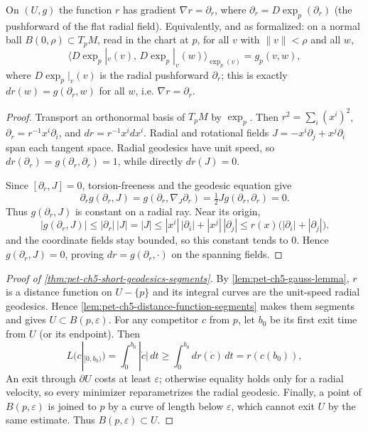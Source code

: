 \begin{lemma}
  \label{lem:pet-ch5-gauss-lemma}
  \leanok
  On $(U,g)$ the function $r$ has gradient $\nabla r=\partial_r$, where
  $\partial_r=D\exp_p(\partial_r)$ (the pushforward of the flat radial field).
  Equivalently, and as formalized: on a normal ball $B(0,\rho)\subset T_pM$,
  read in the chart at $p$, for all $v$ with $\|v\|<\rho$ and all $w$,
  \[
    \big\langle D\exp_p|_v(v),\,D\exp_p|_v(w)\big\rangle_{\exp_p(v)}=g_p(v,w),
  \]
  where $D\exp_p|_v(v)$ is the radial pushforward $\partial_r$; this is exactly
  $dr(w)=g(\partial_r,w)$ for all $w$, i.e. $\nabla r=\partial_r$.
\end{lemma}
\begin{proof}
  \sketch
  Transport an orthonormal basis of $T_pM$ by $\exp_p$.  Then
  $r^2=\sum_i(x^i)^2$, $\partial_r=r^{-1}x^i\partial_i$, and
  $dr=r^{-1}x^idx^i$.  Radial and rotational fields
  $J=-x^i\partial_j+x^j\partial_i$ span each tangent space.  Radial geodesics have
  unit speed, so $dr(\partial_r)=g(\partial_r,\partial_r)=1$, while directly
  $dr(J)=0$.

  Since $[\partial_r,J]=0$, torsion-freeness and the geodesic equation give
  \[
    \partial_rg(\partial_r,J)
    =g(\partial_r,\nabla_J\partial_r)
    =\tfrac12Jg(\partial_r,\partial_r)=0.
  \]
  Thus $g(\partial_r,J)$ is constant on a radial ray.  Near its origin,
  \[
    |g(\partial_r,J)|\le|\partial_r|\,|J|=|J|\le|x^i|\,|\partial_i|+|x^j|\,|\partial_j|
    \le r(x)\big(|\partial_i|+|\partial_j|\big).
  \]
  and the coordinate fields stay bounded, so this constant tends to $0$.  Hence
  $g(\partial_r,J)=0$, proving $dr=g(\partial_r,\cdot)$ on the spanning fields.
\end{proof}
\begin{proof}[Proof of \cref{thm:pet-ch5-short-geodesics-segments}]
  \sketch
  By \cref{lem:pet-ch5-gauss-lemma}, $r$ is a distance function on $U-\{p\}$ and
  its integral curves are the unit-speed radial geodesics.  Hence
  \cref{lem:pet-ch5-distance-function-segments} makes them segments and gives
  $U\subset B(p,\varepsilon)$.  For any competitor $c$ from $p$, let $b_0$ be its
  first exit time from $U$ (or its endpoint).  Then
  \[
    L(c|_{[0,b_0)})=\int_0^{b_0}|\dot c|\,dt\ge\int_0^{b_0}dr(\dot c)\,dt=r(c(b_0)),
  \]
  An exit through $\partial U$ costs at least $\varepsilon$; otherwise equality
  holds only for a radial velocity, so every minimizer reparametrizes the radial
  geodesic.  Finally, a point of $B(p,\varepsilon)$ is joined to $p$ by a curve of
  length below $\varepsilon$, which cannot exit $U$ by the same estimate.  Thus
  $B(p,\varepsilon)\subset U$.
\end{proof}

